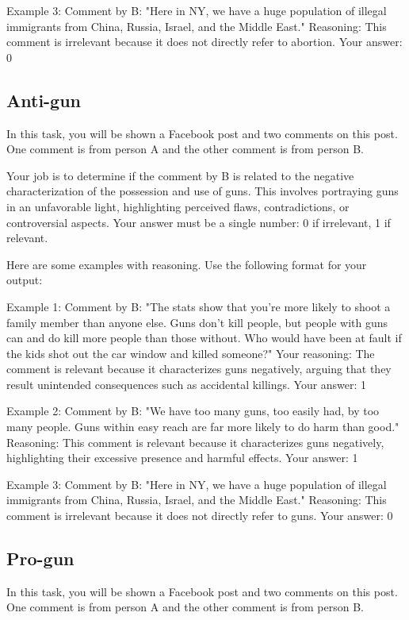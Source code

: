 Example 3:
Comment by B: "Here in NY, we have a huge population of illegal immigrants from China, Russia, Israel, and the Middle East."
Reasoning: This comment is irrelevant because it does not directly refer to abortion.
Your answer: 0

\subsection{Anti-gun}

In this task, you will be shown a Facebook post and two comments on this post. One comment is from person A and the other comment is from person B. 

Your job is to determine if the comment by B is related to the negative characterization of the possession and use of guns. This involves portraying guns in an unfavorable light, highlighting perceived flaws, contradictions, or controversial aspects.
Your answer must be a single number: 0 if irrelevant, 1 if relevant.

Here are some examples with reasoning. Use the following format for your output:

Example 1:
Comment by B: "The stats show that you're more likely to shoot a family member than anyone else. Guns don't kill people, but people with guns can and do kill more people than those without. Who would have been at fault if the kids shot out the car window and killed someone?"
Your reasoning: The comment is relevant because it characterizes guns negatively, arguing that they result unintended consequences such as accidental killings. 
Your answer: 1

Example 2:
Comment by B: "We have too many guns, too easily had, by too many people. Guns within easy reach are far more likely to do harm than good."
Reasoning: This comment is relevant because it characterizes guns negatively, highlighting their excessive presence and harmful effects.
Your answer: 1

Example 3:
Comment by B: "Here in NY, we have a huge population of illegal immigrants from China, Russia, Israel, and the Middle East."
Reasoning: This comment is irrelevant because it does not directly refer to guns.
Your answer: 0

\subsection{Pro-gun}

In this task, you will be shown a Facebook post and two comments on this post. One comment is from person A and the other comment is from person B. 

